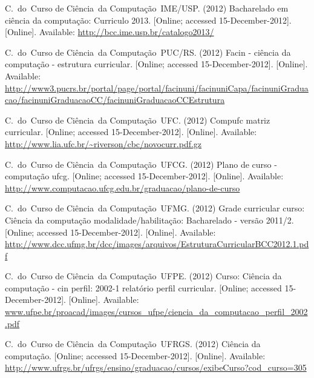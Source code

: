 \documentclass[conference]{IEEEtran}
\begin{document}
\begin{thebibliography}{10}
\BIBentryALTinterwordspacing
C.~do~Curso de Ci\^encia~da Computa{\c c}{\~a}o~IME/USP. (2012) Bacharelado em
  ci\^encia da computa{\c c}{\~a}o: Curriculo 2013. [Online; accessed
  15-December-2012]. [Online]. Available:
  \url{http://bcc.ime.usp.br/catalogo2013/}
\BIBentrySTDinterwordspacing

\BIBentryALTinterwordspacing
C.~do~Curso de Ci\^encia~da Computa{\c c}{\~a}o~PUC/RS. (2012) Facin -
  ci\^encia da computa{\c c}{\~a}o - estrutura curricular. [Online; accessed
  15-December-2012]. [Online]. Available:
  \url{http://www3.pucrs.br/portal/page/portal/facinuni/facinuniCapa/facinuniGraduacao/facinuniGraduacaoCC/facinuniGraduacaoCCEstrutura}
\BIBentrySTDinterwordspacing

\BIBentryALTinterwordspacing
C.~do~Curso de Ci\^encia~da Computa{\c c}{\~a}o~UFC. (2012) Compufc matriz
  curricular. [Online; accessed 15-December-2012]. [Online]. Available:
  \url{http://www.lia.ufc.br/~riverson/cbc/novocurr.pdf.gz}
\BIBentrySTDinterwordspacing

\BIBentryALTinterwordspacing
C.~do~Curso de Ci\^encia~da Computa{\c c}{\~a}o~UFCG. (2012) Plano de curso
  -computa{\c c}{\~a}o ufcg. [Online; accessed 15-December-2012]. [Online].
  Available: \url{http://www.computacao.ufcg.edu.br/graduacao/plano-de-curso}
\BIBentrySTDinterwordspacing

\BIBentryALTinterwordspacing
C.~do~Curso de Ci\^encia~da Computa{\c c}{\~a}o~UFMG. (2012) Grade curricular
  curso: Ci\^encia da computa{\c c}{\~a}o modalidade/habilita{\c c}{\~a}o:
  Bacharelado - vers{\~a}o 2011/2. [Online; accessed 15-December-2012].
  [Online]. Available:
  \url{http://www.dcc.ufmg.br/dcc/images/arquivos/EstruturaCurricularBCC2012.1.pdf}
\BIBentrySTDinterwordspacing

\BIBentryALTinterwordspacing
C.~do~Curso de Ci\^encia~da Computa{\c c}{\~a}o~UFPE. (2012) Curso: Ci\^encia
  da computa{\c c}{\~a}o - cin perfil: 2002-1 relatório perfil curricular.
  [Online; accessed 15-December-2012]. [Online]. Available:
  \url{www.ufpe.br/proacad/images/cursos_ufpe/ciencia_da_computacao_perfil_2002.pdf}
\BIBentrySTDinterwordspacing

\BIBentryALTinterwordspacing
C.~do~Curso de Ci\^encia~da Computa{\c c}{\~a}o~UFRGS. (2012) Ci\^encia da
  computa{\c c}{\~a}o. [Online; accessed 15-December-2012]. [Online].
  Available:
  \url{http://www.ufrgs.br/ufrgs/ensino/graduacao/cursos/exibeCurso?cod_curso=305}
\BIBentrySTDinterwordspacing


\end{thebibliography}
\end{document}
